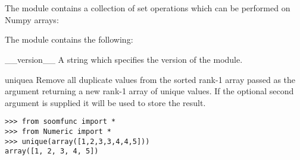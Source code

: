 %
%
%
\section{}


The  module contains a collection of set operations
which can be performed on Numpy arrays:

The  module contains the following:

\begin{datadesc}{__version__}
A string which specifies the version of the  module.
\end{datadesc}

\begin{funcdesc}{unique}{a }
Remove all duplicate values from the sorted rank-1 array passed as the
 argument returning a new rank-1 array of unique values.  If
the optional second argument  is supplied it will be used to
store the result.

\begin{verbatim}
>>> from soomfunc import * 
>>> from Numeric import *
>>> unique(array([1,2,3,3,4,4,5]))
array([1, 2, 3, 4, 5])
\end{verbatim}
\end{funcdesc}

